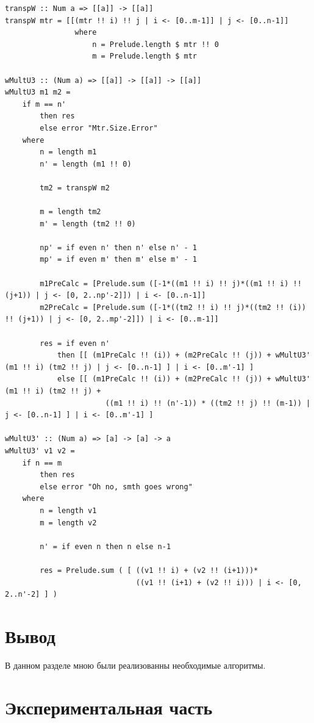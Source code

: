 \documentclass[12pt]{report}
\begin{document}
\begin{lstlisting}[label=some-code,caption=Алгоритм Винограда модификация 3]
transpW :: Num a => [[a]] -> [[a]]
transpW mtr = [[(mtr !! i) !! j | i <- [0..m-1]] | j <- [0..n-1]]
                where                 
                    n = Prelude.length $ mtr !! 0
                    m = Prelude.length $ mtr
    
wMultU3 :: (Num a) => [[a]] -> [[a]] -> [[a]]
wMultU3 m1 m2 = 
    if m == n'
        then res 
        else error "Mtr.Size.Error"
    where
        n = length m1
        n' = length (m1 !! 0)

        tm2 = transpW m2
    
        m = length tm2
        m' = length (tm2 !! 0)
    
        np' = if even n' then n' else n' - 1
        mp' = if even m' then m' else m' - 1
    
        m1PreCalc = [Prelude.sum ([-1*((m1 !! i) !! j)*((m1 !! i) !! (j+1)) | j <- [0, 2..np'-2]]) | i <- [0..n-1]]
        m2PreCalc = [Prelude.sum ([-1*((tm2 !! i) !! j)*((tm2 !! (i)) !! (j+1)) | j <- [0, 2..mp'-2]]) | i <- [0..m-1]]

        res = if even n'
            then [[ (m1PreCalc !! (i)) + (m2PreCalc !! (j)) + wMultU3' (m1 !! i) (tm2 !! j) | j <- [0..n-1] ] | i <- [0..m'-1] ]
            else [[ (m1PreCalc !! (i)) + (m2PreCalc !! (j)) + wMultU3' (m1 !! i) (tm2 !! j) + 
                       ((m1 !! i) !! (n'-1)) * ((tm2 !! j) !! (m-1)) | j <- [0..n-1] ] | i <- [0..m'-1] ]
    
wMultU3' :: (Num a) => [a] -> [a] -> a
wMultU3' v1 v2 = 
    if n == m
        then res
        else error "Oh no, smth goes wrong"
    where
        n = length v1
        m = length v2
    
        n' = if even n then n else n-1
    
        res = Prelude.sum ( [ ((v1 !! i) + (v2 !! (i+1)))*
                              ((v1 !! (i+1) + (v2 !! i))) | i <- [0, 2..n'-2] ] )
\end{lstlisting}

\chapter*{Вывод}

	В данном разделе мною были реализованны  необходимые алгоритмы.

\chapter{Экспериментальная часть}
\end{document}
